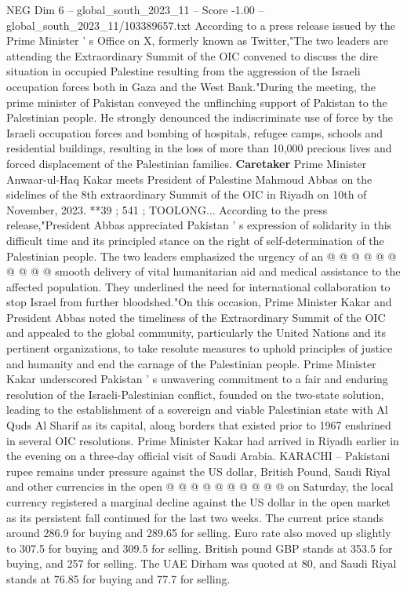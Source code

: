 \begin{textsample}{NEG Dim 6 – global\_south\_2023\_11 – Score -1.00 – global\_south\_2023\_11/103389657.txt}  \label{ex:f6_neg_155}
According to a press release issued by the Prime Minister ' s Office on X, formerly known as Twitter,"The two leaders are attending the Extraordinary Summit of the OIC convened to discuss the dire situation in occupied Palestine resulting from the aggression of the Israeli occupation forces both in Gaza and the West Bank."During the meeting, the prime minister of Pakistan conveyed the unflinching support of Pakistan to the Palestinian people.
He strongly denounced the indiscriminate use of force by the Israeli occupation forces and bombing of hospitals, refugee camps, schools and residential buildings, resulting in the loss of more than 10,000 precious lives and forced displacement of the Palestinian families. \textbf{Caretaker} Prime Minister Anwaar-ul-Haq Kakar meets President of Palestine Mahmoud Abbas on the sidelines of the 8th extraordinary Summit of the OIC in Riyadh on 10th of November, 2023. **39 ; 541 ; TOOLONG...
According to the press release,"President Abbas appreciated Pakistan ' s expression of solidarity in this difficult time and its principled stance on the right of self-determination of the Palestinian people.
The two leaders emphasized the urgency of an @ @ @ @ @ @ @ @ @ @ smooth delivery of vital humanitarian aid and medical assistance to the affected population.
They underlined the need for international collaboration to stop Israel from further bloodshed."On this occasion, Prime Minister Kakar and President Abbas noted the timeliness of the Extraordinary Summit of the OIC and appealed to the global community, particularly the United Nations and its pertinent organizations, to take resolute measures to uphold principles of justice and humanity and end the carnage of the Palestinian people.
Prime Minister Kakar underscored Pakistan ' s unwavering commitment to a fair and enduring resolution of the Israeli-Palestinian conflict, founded on the two-state solution, leading to the establishment of a sovereign and viable Palestinian state with Al Quds Al Sharif as its capital, along borders that existed prior to 1967 enshrined in several OIC resolutions.
Prime Minister Kakar had arrived in Riyadh earlier in the evening on a three-day official visit of Saudi Arabia.
KARACHI -- Pakistani rupee remains under pressure against the US dollar, British Pound, Saudi Riyal and other currencies in the open @ @ @ @ @ @ @ @ @ @ on Saturday, the local currency registered a marginal decline against the US dollar in the open market as its persistent fall continued for the last two weeks.
The current price stands around 286.9 for buying and 289.65 for selling.
Euro rate also moved up slightly to 307.5 for buying and 309.5 for selling.
British pound GBP stands at 353.5 for buying, and 257 for selling.
The UAE Dirham was quoted at 80, and Saudi Riyal stands at 76.85 for buying and 77.7 for selling.

\end{textsample}
